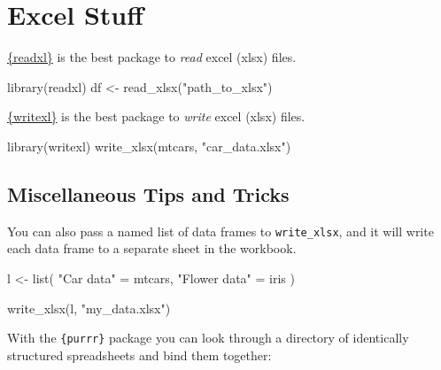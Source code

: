 \documentclass[
  letterpaper,
  DIV=11,
  numbers=noendperiod]{scrreprt}
\newenvironment{Shaded}{\begin{snugshade}}{\end{snugshade}}
\newcommand{\FunctionTok}[1]{\textcolor[rgb]{0.28,0.35,0.67}{#1}}
\newcommand{\NormalTok}[1]{\textcolor[rgb]{0.00,0.23,0.31}{#1}}
\newcommand{\OtherTok}[1]{\textcolor[rgb]{0.00,0.23,0.31}{#1}}
\newcommand{\StringTok}[1]{\textcolor[rgb]{0.13,0.47,0.30}{#1}}
\begin{document}

\chapter{Excel Stuff}\label{excel-stuff}

\href{https://readxl.tidyverse.org/}{\{readxl\}} is the best package to
\emph{read} excel (xlsx) files.

\begin{Shaded}
\begin{Highlighting}[]
\FunctionTok{library}\NormalTok{(readxl)}
\NormalTok{df }\OtherTok{\textless{}{-}} \FunctionTok{read\_xlsx}\NormalTok{(}\StringTok{"path\_to\_xlsx"}\NormalTok{)}
\end{Highlighting}
\end{Shaded}

\href{https://docs.ropensci.org/writexl/}{\{writexl\}} is the best
package to \emph{write} excel (xlsx) files.

\begin{Shaded}
\begin{Highlighting}[]
\FunctionTok{library}\NormalTok{(writexl)}
\FunctionTok{write\_xlsx}\NormalTok{(mtcars, }\StringTok{"car\_data.xlsx"}\NormalTok{)}
\end{Highlighting}
\end{Shaded}

\section{Miscellaneous Tips and
Tricks}\label{miscellaneous-tips-and-tricks}

You can also pass a named list of data frames to \texttt{write\_xlsx},
and it will write each data frame to a separate sheet in the workbook.

\begin{Shaded}
\begin{Highlighting}[]
\NormalTok{l }\OtherTok{\textless{}{-}} \FunctionTok{list}\NormalTok{(}
  \StringTok{"Car data"} \OtherTok{=}\NormalTok{ mtcars,}
  \StringTok{"Flower data"} \OtherTok{=}\NormalTok{ iris}
\NormalTok{)}

\FunctionTok{write\_xlsx}\NormalTok{(l, }\StringTok{"my\_data.xlsx"}\NormalTok{)}
\end{Highlighting}
\end{Shaded}

With the \texttt{\{purrr\}} package you can look through a directory of
identically structured spreadsheets and bind them together:
\end{document}
